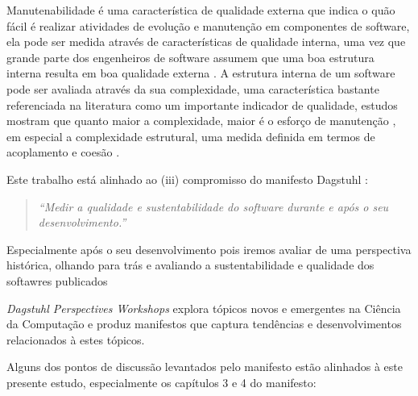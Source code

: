 Manutenabilidade é uma característica de qualidade externa que indica o quão
fácil é realizar atividades de evolução e manutenção em componentes de
software, ela pode ser medida através de características de qualidade interna,
uma vez que grande parte dos engenheiros de software assumem que uma boa
estrutura interna resulta em boa qualidade externa \cite{Fenton2014}. A
estrutura interna de um software pode ser avaliada através da sua complexidade,
uma característica bastante referenciada na literatura como um importante
indicador de qualidade, estudos mostram que quanto maior a complexidade, maior
é o esforço de manutenção \cite{hashim1996software, Darcy2005}, em especial a
complexidade estrutural, uma medida definida em termos de acoplamento e coesão
\cite{Terceiro2012}.

Este trabalho está alinhado ao (iii) compromisso do manifesto Dagstuhl \cite{allen2017engineering}: 

\begin{quote}
{\it ``Medir a qualidade e sustentabilidade do software durante e após o seu
desenvolvimento.''}
\end{quote}

Especialmente após o seu desenvolvimento pois iremos avaliar
de uma perspectiva histórica, olhando para trás e avaliando a sustentabilidade
e qualidade dos softawres publicados

{\it Dagstuhl Perspectives Workshops} explora tópicos novos e emergentes na Ciência da Computação
e produz manifestos que captura tendências e desenvolvimentos relacionados à estes tópicos.

Alguns dos pontos de discussão levantados pelo manifesto estão alinhados à este presente estudo, especialmente
os capítulos 3 e 4 do manifesto:

